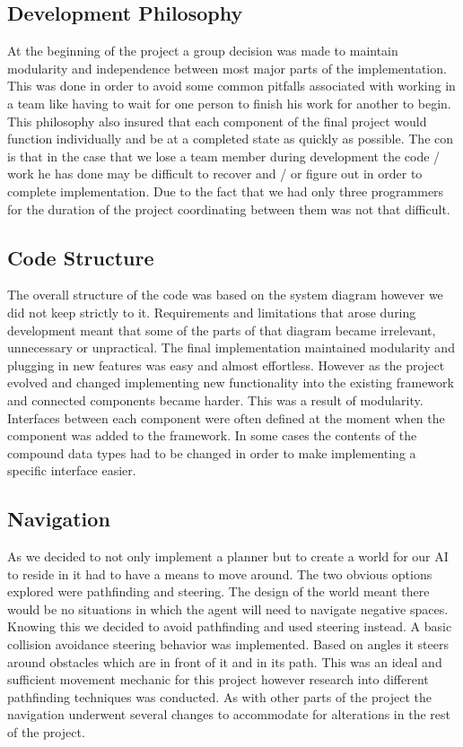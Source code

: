 \documentclass[a4paper]{report}
\begin{document}
\subsection{Development Philosophy}
At the beginning of the project a group decision was made to maintain modularity and independence between most major parts of the implementation. 
This was done in order to avoid some common pitfalls associated with working in a team like having to wait for one person to finish his work for another to begin. This philosophy also insured that each component of the final project would function individually and be at a completed state as quickly as possible.
The con is that in the case that we lose a team member during development the code / work he has done may be difficult to recover and / or figure out in order to complete implementation. 
 Due to the fact that we had only three programmers for the duration of the project coordinating between them was not that difficult. 
\subsection{Code Structure}
The overall structure of the code was based on the system diagram however we did not keep strictly to it. Requirements and limitations that arose during development meant that some of the parts of that diagram became irrelevant, unnecessary or unpractical. 
The final implementation maintained modularity and plugging in new features was easy and almost effortless.
However as the project evolved and changed implementing new functionality into the existing framework and connected components became harder. This was a result of modularity. Interfaces between each component were often defined at the moment when the component was added to the framework. In some cases the contents of the compound data types had to be changed in order to make implementing a specific interface easier.
\subsection{Navigation}
As we decided to not only implement a planner but to create a world for our AI to reside in it had to have a means to move around. 
The two obvious options explored were pathfinding and steering. The design of the world meant there would be no situations in which the agent will need to navigate negative spaces. Knowing this we decided to avoid pathfinding and used steering instead. 
A basic collision avoidance steering behavior was implemented. Based on angles it steers around obstacles which are in front of it and in its path. This was an ideal and sufficient movement mechanic for this project however research into different pathfinding techniques was conducted. 
As with other parts of the project the navigation underwent several changes to accommodate for alterations in the rest of the project.
\end{document}
